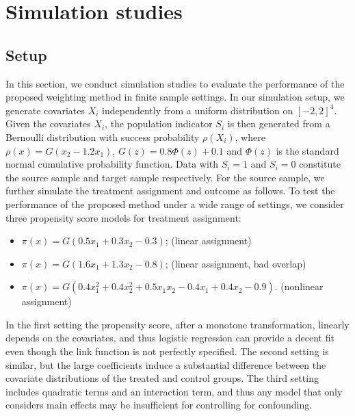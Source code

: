 \documentclass[12pt]{article}
\begin{document}

\section{Simulation studies}
\label{sec:simu}

\subsection{Setup}

In this section, we conduct simulation studies to evaluate the performance of the proposed weighting method in finite sample settings. In our simulation setup, we generate covariates $X_i$ independently from a uniform distribution on $[-2, 2]^4$. Given the covariates $X_i$, the population indicator $S_i$ is then generated from a Bernoulli distribution with success probability $\rho(X_i)$, where
$\rho(x) = G(x_2 - 1.2 x_1)$, $G(z) = 0.8 \Phi(z) + 0.1$ and $\Phi(z)$ is the standard normal cumulative probability function. 
Data with $S_i=1$ and $S_i=0$ constitute the source sample and target sample respectively. For the source sample, we further simulate the treatment assignment and outcome as follows.
To test the performance of the proposed method under a wide range of settings, we consider three propensity score models for treatment assignment:
\begin{itemize}[itemsep=0pt, parsep=0pt, topsep=4pt]
    \item[(1)] $\pi(x) = G(0.5 x_1 + 0.3 x_2 - 0.3)$; \hfill (linear assignment)
    \item[(2)] $\pi(x) = G(1.6 x_1 + 1.3 x_2 - 0.8)$; \hfill (linear assignment, bad overlap)
    \item[(3)] $\pi(x) = G(0.4 x_1^2 + 0.4 x_2^2 + 0.5 x_1 x_2 - 0.4 x_1 + 0.4 x_2 - 0.9)$. \hfill (nonlinear assignment)
\end{itemize}
In the first setting the propensity score, after a monotone transformation, linearly depends on the covariates, and thus logistic regression can provide a decent fit even though the link function is not perfectly specified. The second setting is similar, but the large coefficients induce a substantial difference between the covariate distributions of the treated and control groups. The third setting includes quadratic terms and an interaction term, and thus any model that only considers main effects may be insufficient for controlling for confounding.
\end{document}
